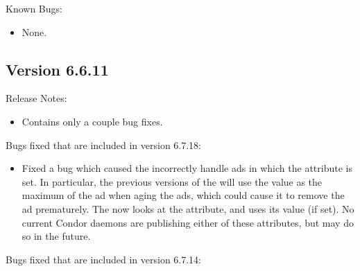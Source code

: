 \noindent Known Bugs:

\begin{itemize}

\item None.

\end{itemize}


\subsection{\label{sec:New-6-6-11}Version 6.6.11}

\noindent Release Notes:

\begin{itemize}

\item Contains only a couple bug fixes.

\end{itemize}

%
%
%

\noindent Bugs fixed that are included in version 6.7.18:

\begin{itemize}

\item Fixed a bug which caused the  incorrectly
  handle ads in which the  attribute is set.
  In particular, the previous versions of the  will
  use the  value as the maximum 
  of the ad when aging the ads, which could cause it to remove the ad
  prematurely.
  The  now looks at the 
  attribute, and uses its value (if set).
  \Note No current Condor daemons are publishing either of these
  attributes, but may do so in the future.

\end{itemize}

\noindent Bugs fixed that are included in version 6.7.14:

